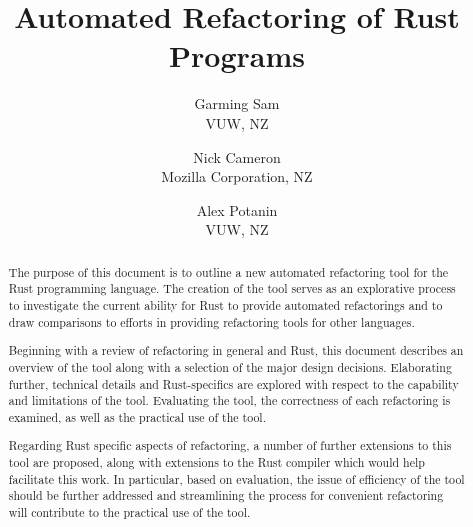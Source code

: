 \documentclass{sig-alternate-05-2015}
\begin{document}
\title{Automated Refactoring of Rust Programs}

\author{Garming Sam\\ VUW, NZ \and Nick Cameron\\ Mozilla Corporation, NZ \and Alex Potanin\\ VUW, NZ}

\maketitle

\begin{abstract}
The purpose of this document is to outline a new automated refactoring tool for the Rust programming language. The creation of the tool serves as an explorative process to investigate the current ability for Rust to provide automated refactorings and to draw comparisons to  efforts in providing refactoring tools for other languages. 

Beginning with a review of refactoring in general and Rust, this document describes an overview of the tool along with a selection of the major design decisions. Elaborating further, technical details and Rust-specifics are explored with respect to the capability and limitations of the tool. Evaluating the tool, the correctness of each refactoring is examined, as well as the practical use of the tool.

Regarding Rust specific aspects of refactoring, a number of further extensions to this tool are proposed, along with extensions to the Rust compiler which would help facilitate this work. In particular, based on evaluation, the issue of efficiency of the tool should be further addressed and streamlining the process for convenient refactoring will contribute to the practical use of the tool.
\end{abstract}










\end{document}
